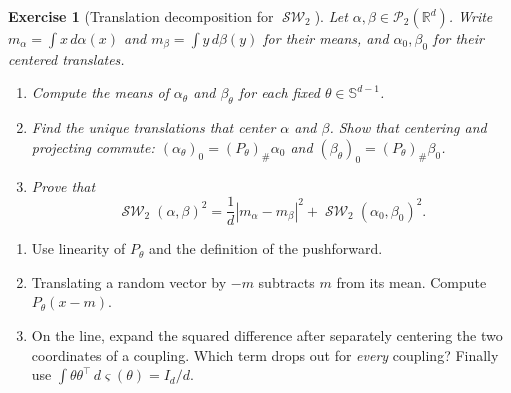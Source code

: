 \documentclass[11pt,a4paper]{article}
\theoremstyle{exostyle}
\newtheorem{exercise}{Exercise}
\newcommand{\R}{\mathbb{R}}
\newcommand{\push}{\#}
\DeclareMathOperator{\SW}{\mathcal{SW}}
\newcommand{\PPtwo}{\mathcal P_2}
\newcommand{\Sphere}{\mathbb S}
\begin{document}
\begin{exercise}[Translation decomposition for $\SW_2$]\label{ex-sliced-centering}
Let $\alpha,\beta\in\PPtwo(\R^d)$. Write $m_\alpha=\int x\,d\alpha(x)$
and $m_\beta=\int y\,d\beta(y)$ for their means, and
$\alpha_0,\beta_0$ for their centered translates.
\begin{enumerate}[label=(\alph*)]
\item Compute the means of $\alpha_\theta$ and $\beta_\theta$ for
  each fixed $\theta\in\Sphere^{d-1}$.
\item Find the unique translations that center $\alpha$ and $\beta$.
  Show that centering and projecting commute:
  $(\alpha_\theta)_0=(P_\theta)_\push\alpha_0$ and
  $(\beta_\theta)_0=(P_\theta)_\push\beta_0$.
\item Prove that
\[
  \SW_2(\alpha,\beta)^2
    =\frac1d|m_\alpha-m_\beta|^2+\SW_2(\alpha_0,\beta_0)^2.
\]
\end{enumerate}
\end{exercise}
\begin{hints}
\begin{enumerate}[label=(\alph*)]
\item Use linearity of $P_\theta$ and the definition of the pushforward.
\item Translating a random vector by $-m$ subtracts $m$ from its mean.
  Compute $P_\theta(x-m)$.
\item On the line, expand the squared difference after separately
  centering the two coordinates of a coupling. Which term drops out
  for \emph{every} coupling? Finally use
  $\int\theta\theta^\top\,d\varsigma(\theta)=I_d/d$.
\end{enumerate}
\end{hints}
\end{document}
